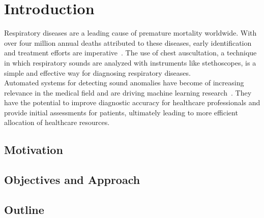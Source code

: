 \cleardoubleoddpage%
\chapter{Introduction}
Respiratory diseases are a leading cause of premature mortality worldwide. With over four million annual deaths attributed to these diseases, early identification and treatment efforts are imperative~\cite{ferkol2014global}. The use of chest auscultation, a technique in which respiratory sounds are analyzed with instruments like stethoscopes, is a simple and effective way for diagnosing respiratory diseases. \\
Automated systems for detecting sound anomalies have become of increasing relevance in the medical field and are driving machine learning research~\cite{bohadana2014fundamentals}. They have the potential to improve diagnostic accuracy for healthcare professionals and provide initial assessments for patients, ultimately leading to more efficient allocation of healthcare resources. 

\section{Motivation}



\section{Objectives and Approach}



\section{Outline}



